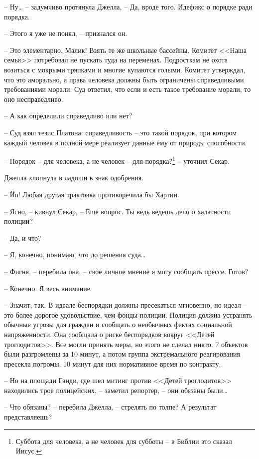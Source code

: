 -- Ну\ldots{} -- задумчиво протянула Джелла, -- Да, вроде того. Идефикс о порядке ради порядка.

-- Этого я уже не понял, -- признался он.

-- Это элементарно, Малик! Взять те же школьные бассейны. Комитет <<Наша семья>> потребовал не пускать туда на переменах. Подросткам не охота возиться с мокрыми тряпками и многие купаются голыми. Комитет утверждал, что это аморально, а права человека должны быть ограничены справедливыми требованиями морали. Суд ответил, что если и есть такое требование морали, то оно несправедливо.

-- А как определили справедливо или нет?

-- Суд взял тезис Платона: справедливость -- это такой порядок, при котором каждый человек в полной мере реализует данные ему от природы способности.

-- Порядок -- для человека, а не человек -- для порядка?\footnote{Суббота для человека, а не человек для субботы -- в Библии это сказал Иисус.} -- уточнил Секар.

Джелла хлопнула в ладоши в знак одобрения.

-- Йо! Любая другая трактовка противоречила бы Хартии.

-- Ясно, -- кивнул Секар, -- Еще вопрос. Ты ведь ведешь дело о халатности полиции?

-- Да, и что?

-- Я, конечно, понимаю, что до решения суда\ldots{}

-- Фигня, -- перебила она, -- свое личное мнение я могу сообщать прессе. Готов?

-- Конечно. Я весь внимание.

-- Значит, так. В идеале беспорядки должны пресекаться мгновенно, но идеал -- это более дорогое удовольствие, чем фонды полиции. Полиция должна устранять обычные угрозы для граждан и сообщать о необычных фактах социальной напряженности. Она сообщала о риске беспорядков вокруг <<Детей троглодитов>>. Все могли принять меры, но этого не сделал никто. 7 объектов были разгромлены за 10 минут, а потом группа экстремального реагирования пресекла погромы. 10 минут для них нормативное время по контракту.

-- Но на площади Ганди, где шел митинг против <<Детей троглодитов>> находились трое полицейских, -- заметил репортер, -- они обязаны были\ldots{}

-- Что обязаны? -- перебила Джелла, -- стрелять по толпе? А результат представляешь?

